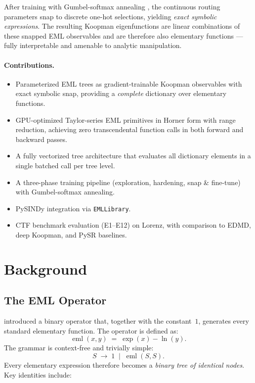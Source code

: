 \documentclass[11pt]{article}
\DeclareMathOperator{\eml}{eml}
\begin{document}
After training with Gumbel-softmax annealing \citep{jang2017}, the continuous routing parameters snap
to discrete one-hot selections, yielding \emph{exact symbolic expressions}.  The
resulting Koopman eigenfunctions are linear combinations of these snapped EML
observables and are therefore also elementary functions --- fully interpretable and
amenable to analytic manipulation.

\paragraph{Contributions.}
\begin{itemize}
    \item Parameterized EML trees as gradient-trainable Koopman observables with
          exact symbolic snap, providing a \emph{complete} dictionary over elementary
          functions.
    \item GPU-optimized Taylor-series EML primitives in Horner form with range
          reduction, achieving zero transcendental function calls in both forward
          and backward passes.
    \item A fully vectorized tree architecture that evaluates all dictionary elements
          in a single batched call per tree level.
    \item A three-phase training pipeline (exploration, hardening, snap \& fine-tune)
          with Gumbel-softmax annealing.
    \item PySINDy integration via \texttt{EMLLibrary}.
    \item CTF benchmark evaluation (E1--E12) on Lorenz, with comparison to EDMD,
          deep Koopman, and PySR baselines.
\end{itemize}


\section{Background}
\label{sec:background}

\subsection{The EML Operator}
\label{sec:eml}

\citet{odrzywołek2026} introduced a binary operator that, together with the
constant~$1$, generates every standard elementary function.  The operator is
defined as:
\begin{equation}\label{eq:eml}
  \eml(x, y) \;=\; \exp(x) - \ln(y).
\end{equation}
The grammar is context-free and trivially simple:
\begin{equation}\label{eq:grammar}
  S \;\to\; 1 \;\mid\; \eml(S, S).
\end{equation}
Every elementary expression therefore becomes a \emph{binary tree of identical
nodes}.  Key identities include:
\end{document}
